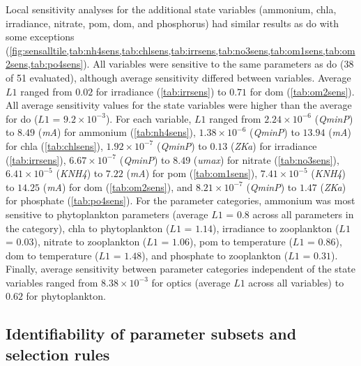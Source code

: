 \documentclass[review]{elsarticle}\usepackage[]{graphicx}\usepackage[]{color}
\begin{document}
Local sensitivity analyses for the additional state variables (ammonium, \ac{chla}, irradiance, nitrate, \ac{pom}, \ac{dom}, and phosphorus) had similar results as \ac{do} with some exceptions (\cref{fig:sensalltile,tab:nh4sens,tab:chlsens,tab:irrsens,tab:no3sens,tab:om1sens,tab:om2sens,tab:po4sens}).  All variables were sensitive to the same parameters as \ac{do} (38 of 51 evaluated), although average sensitivity differed between variables.  Average $L1$ ranged from $0.02$ for irradiance (\cref{tab:irrsens}) to $0.71$ for \ac{dom} (\cref{tab:om2sens}).  All average sensitivity values for the state variables were higher than the average for \ac{do} ($L1$ = $9.2\times 10^{-3}$).  For each variable, $L1$ ranged from $2.24\times 10^{-6}$ (\textit{QminP}) to $8.49$ (\textit{mA}) for ammonium (\cref{tab:nh4sens}), $1.38\times 10^{-6}$ (\textit{QminP}) to $13.94$ (\textit{mA}) for \ac{chla} (\cref{tab:chlsens}), $1.92\times 10^{-7}$ (\textit{QminP}) to $0.13$ (\textit{ZKa}) for irradiance (\cref{tab:irrsens}), $6.67\times 10^{-7}$ (\textit{QminP}) to $8.49$ (\textit{umax}) for nitrate (\cref{tab:no3sens}), $6.41\times 10^{-5}$ (\textit{KNH4}) to $7.22$ (\textit{mA}) for \ac{pom} (\cref{tab:om1sens}),  $7.41\times 10^{-5}$ (\textit{KNH4}) to $14.25$ (\textit{mA}) for \ac{dom} (\cref{tab:om2sens}), and $8.21\times 10^{-7}$ (\textit{QminP}) to $1.47$ (\textit{ZKa}) for phosphate (\cref{tab:po4sens}).  For the parameter categories, ammonium was most sensitive to phytoplankton parameters (average $L1$ = $0.8$ across all parameters in the category), \ac{chla} to phytoplankton ($L1$ = $1.14$), irradiance to zooplankton ($L1$ = $0.03$), nitrate to zooplankton ($L1$ = $1.06$), \ac{pom} to temperature ($L1$ = $0.86$), \ac{dom} to temperature ($L1$ = $1.48$), and phosphate to zooplankton ($L1$ = $0.31$).  Finally, average sensitivity between parameter categories independent of the state variables ranged from $8.38\times 10^{-3}$ for optics (average $L1$ across all variables) to $0.62$ for phytoplankton. 

\subsection{Identifiability of parameter subsets and selection rules}
\end{document}
